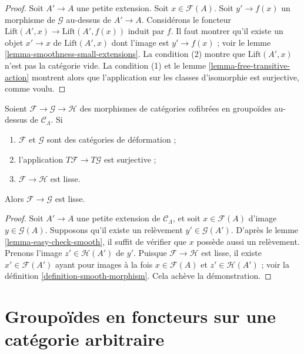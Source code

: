\begin{proof}
Soit $A' \to A$ une petite extension. Soit $x \in \mathcal{F}(A)$. Soit
$y' \to f(x)$ un morphisme de $\mathcal{G}$ au-dessus de $A' \to A$.
Considérons le foncteur $\text{Lift}(A', x) \to \text{Lift}(A', f(x))$ induit
par $f$. Il faut montrer qu'il existe un objet $x' \to x$ de
$\text{Lift}(A', x)$ dont l'image est $y' \to f(x)$ ; voir le lemme
\ref{lemma-smoothness-small-extensions}. La condition (2) montre que
$\text{Lift}(A', x)$ n'est pas la catégorie vide. La condition (1) et le lemme
\ref{lemma-free-transitive-action} montrent alors que l'application sur les
classes d'isomorphie est surjective, comme voulu.
\end{proof}

\begin{lemma}
\label{lemma-map-between-smooth}
Soient $\mathcal{F} \to \mathcal{G} \to \mathcal{H}$ des morphismes de
catégories cofibrées en groupoïdes au-dessus de $\mathcal{C}_\Lambda$. Si
\begin{enumerate}
\item $\mathcal{F}$ et $\mathcal{G}$ sont des catégories de déformation ;
\item l'application $T\mathcal{F} \to T\mathcal{G}$ est surjective ;
\item $\mathcal{F} \to \mathcal{H}$ est lisse.
\end{enumerate}
Alors $\mathcal{F} \to \mathcal{G}$ est lisse.
\end{lemma}

\begin{proof}
Soit $A' \to A$ une petite extension de $\mathcal{C}_\Lambda$, et soit
$x \in \mathcal{F}(A)$ d'image $y \in \mathcal{G}(A)$. Supposons qu'il existe
un relèvement $y' \in \mathcal{G}(A')$. D'après le lemme
\ref{lemma-easy-check-smooth}, il suffit de vérifier que $x$ possède aussi un
relèvement. Prenons l'image $z' \in \mathcal{H}(A')$ de $y'$. Puisque
$\mathcal{F} \to \mathcal{H}$ est lisse, il existe
$x' \in \mathcal{F}(A')$ ayant pour images à la fois
$x \in \mathcal{F}(A)$ et $z' \in \mathcal{H}(A')$ ; voir la définition
\ref{definition-smooth-morphism}. Cela achève la démonstration.
\end{proof}





\section{Groupoïdes en foncteurs sur une catégorie arbitraire}
\label{section-groupoids-arbitrary}

